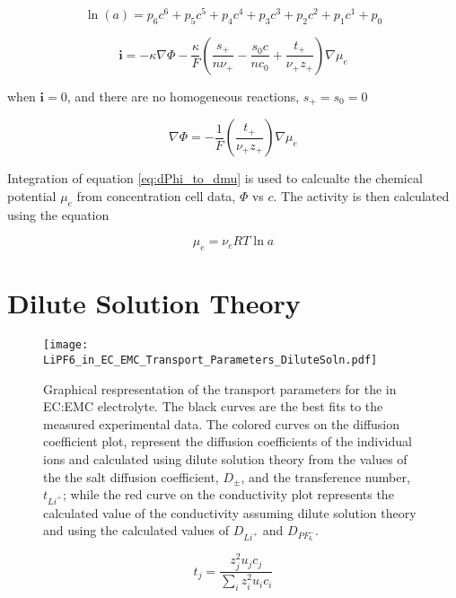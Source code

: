 \documentclass[12pt]{article}
\newcommand{\solcur}{\mathrm{\mathbf{i}}}
\begin{document}
	\begin{equation}
		\ln(a) = p_6 c^6 + p_5 c^5 + p_4 c^4 + p_3 c^3 + p_2 c^2 + p_1 c^1 + p_0
	\end{equation}

	\begin{equation}
		\solcur = -\kappa \nabla \Phi - \frac{\kappa}{F} \left( \frac{s_+}{n \nu_+} - \frac{s_0 c}{n c_0} + \frac{t_+}{\nu_+ z_+} \right) \nabla \mu_e
	\end{equation}

	when $\solcur = 0$, and there are no homogeneous reactions, $s_+ = s_0 = 0$

	\begin{equation} \label{eq:dPhi_to_dmu}
		\nabla \Phi  =  - \frac{1}{F} \left( \frac{t_+}{\nu_+ z_+} \right) \nabla \mu_e
	\end{equation}

	Integration of equation \ref{eq:dPhi_to_dmu} is used to calcualte the chemical potential $\mu_e$ from concentration cell data, $\Phi$ vs $c$. The activity is then calculated using the equation

	\begin{equation}
		\mu_e = \nu_e RT \ln{a}
	\end{equation}

	\clearpage 

	\section{Dilute Solution Theory}

	\begin{figure}[h]
		\centering
		\texttt{[image: LiPF6\_in\_EC\_EMC\_Transport\_Parameters\_DiluteSoln.pdf]}
		\caption{Graphical respresentation of the transport parameters for the  in EC:EMC electrolyte. The black curves are the best fits to the measured experimental data. The colored curves on the diffusion coefficient plot, represent the diffusion coefficients of the individual ions  and  calculated using dilute solution theory from the values of the the salt diffusion coefficient, $D_{\pm}$, and the transference number, $t_{Li^+}$; while the red curve on the conductivity plot represents the calculated value of the conductivity assuming dilute solution theory and using the calculated values of $D_{Li^+}$ and $D_{PF_6^-}$. }
		\label{fig:DiluteTransportParams_EC_EMC}
	\end{figure}

	\begin{equation} %
		t_j = \frac{z_j^2 u_j c_j}{\sum_i z_i^2 u_i c_i}
	\end{equation}
\end{document}
